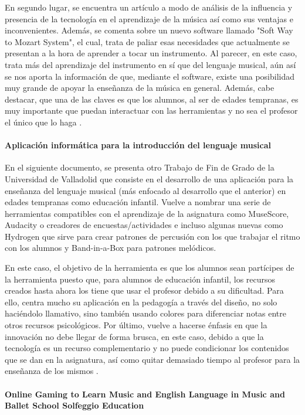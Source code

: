 En segundo lugar, se encuentra un artículo a modo de análisis de la influencia y presencia de la tecnología en el aprendizaje de la música así como sus ventajas e inconvenientes. Además, se comenta sobre un nuevo software llamado "Soft Way to Mozart System", el cual, trata de paliar esas necesidades que actualmente se presentan a la hora de aprender a tocar un instrumento. Al parecer, en este caso, trata más del aprendizaje del instrumento en sí que del lenguaje musical, aún así se nos aporta la información de que, mediante el software, existe una posibilidad muy grande de apoyar la enseñanza de la música en general. Además, cabe destacar, que una de las claves es que los alumnos, al ser de edades tempranas, es muy importante que puedan interactuar con las herramientas y no sea el profesor el único que lo haga \cite{Gorbunova2019}.

\paragraph{Aplicación informática para la introducción del lenguaje musical}

En el siguiente documento, se presenta otro Trabajo de Fin de Grado de la Universidad de Valladolid que consiste en el desarrollo de una aplicación para la enseñanza del lenguaje musical (más enfocado al desarrollo que el anterior) en edades tempranas como educación infantil. Vuelve a nombrar una serie de herramientas compatibles con el aprendizaje de la asignatura como MuseScore, Audacity o creadores de encuestas/actividades e incluso algunas nuevas como Hydrogen que sirve para crear patrones de percusión con los que trabajar el ritmo con los alumnos y Band-in-a-Box para patrones melódicos.

En este caso, el objetivo de la herramienta es que los alumnos sean partícipes de la herramienta puesto que, para alumnos de educación infantil, los recursos creados hasta ahora los tiene que usar el profesor debido a su dificultad. Para ello, centra mucho su aplicación en la pedagogía a través del diseño, no solo haciéndolo llamativo, sino también usando colores para diferenciar notas entre otros recursos psicológicos. Por último, vuelve a hacerse énfasis en que la innovación no debe llegar de forma brusca, en este caso, debido a que la tecnología es un recurso complementario y no puede condicionar los contenidos que se dan en la asignatura, así como quitar demasiado tiempo al profesor para la enseñanza de los mismos \cite{GarciaAguirre2017}.

\paragraph{Online Gaming to Learn Music and English Language in Music and Ballet School Solfeggio Education}

